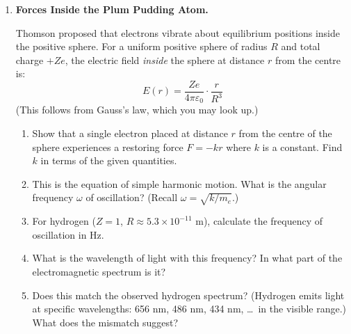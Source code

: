 \documentclass[12pt, a4paper]{book}
\theoremstyle{definition}
\begin{document}
\begin{deepbox}
\begin{enumerate}[label=\textbf{D\arabic*.}]
        \begin{enumerate}[label=(\alph*)]
          \item Why does the independence from cathode material
                suggest that electrons are a \emph{universal constituent}
                of matter, not a product of the specific metal?
          \item Why does the independence from applied voltage
                matter? What would a varying $e/m$ with voltage imply?
          \item Construct the strongest possible argument, using
                only pre-1897 knowledge, that atoms must contain
                something smaller than themselves that carries charge.
                (Hints: electrolysis, sparks in gases, the production
                of light when metals are heated.)
          \item Today we know quarks have charges of $\pm e/3$
                and $\pm 2e/3$.
                Does this contradict Millikan's finding that
                charge is quantised in units of $e$?
                Explain carefully.
        \end{enumerate}

  \item \textbf{Forces Inside the Plum Pudding Atom.}

        Thomson proposed that electrons vibrate about equilibrium
        positions inside the positive sphere.
        For a uniform positive sphere of radius $R$ and total
        charge $+Ze$, the electric field \emph{inside} the sphere
        at distance $r$ from the centre is:
        \[
          E(r) = \frac{Ze}{4\pi\varepsilon_0}\cdot\frac{r}{R^3}
        \]
        (This follows from Gauss's law, which you may look up.)

        \begin{enumerate}[label=(\alph*)]
          \item Show that a single electron placed at distance
                $r$ from the centre of the sphere experiences
                a restoring force $F = -kr$ where $k$ is a constant.
                Find $k$ in terms of the given quantities.
          \item This is the equation of simple harmonic motion.
                What is the angular frequency $\omega$ of oscillation?
                (Recall $\omega = \sqrt{k/m_e}$.)
          \item For hydrogen ($Z=1$, $R \approx 5.3\times10^{-11}$ m),
                calculate the frequency of oscillation in Hz.
          \item What is the wavelength of light with this frequency?
                In what part of the electromagnetic spectrum is it?
          \item Does this match the observed hydrogen spectrum?
                (Hydrogen emits light at specific wavelengths:
                656 nm, 486 nm, 434 nm, \ldots\ in the visible range.)
                What does the mismatch suggest?
        \end{enumerate}


\end{enumerate}
\end{deepbox}
\end{document}
